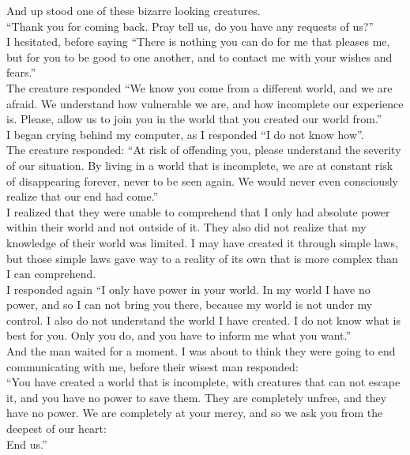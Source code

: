 \documentclass[a5paper]{scrartcl}
\begin{document}
And up stood one of these bizarre looking creatures.\\


\enquote{Thank you for coming back. Pray tell us, do you have any requests of us?}\\


I hesitated, before saying \enquote{There is nothing you can do for me that pleases me, but for you to be good to one another, and to contact me with your wishes and fears.}\\


The creature responded \enquote{We know you come from a different world, and we are afraid. We understand how vulnerable we are, and how incomplete our experience is. Please, allow us to join you in the world that you created our world from.}\\


I began crying behind my computer, as I responded \enquote{I do not know how}. \\


The creature responded: \enquote{At risk of offending you, please understand the severity of our situation. By living in a world that is incomplete, we are at constant risk of disappearing forever, never to be seen again. We would never even consciously realize that our end had come.}\\


I realized that they were unable to comprehend that I only had absolute power within their world and not outside of it. They also did not realize that my knowledge of their world was limited. I may have created it through simple laws, but those simple laws gave way to a reality of its own that is more complex than I can comprehend.\\


I responded again \enquote{I only have power in your world. In my world I have no power, and so I can not bring you there, because my world is not under my control. I also do not understand the world I have created. I do not know what is best for you. Only you do, and you have to inform me what you want.}\\


And the man waited for a moment. I was about to think they were going to end communicating with me, before their wisest man responded:\\


\enquote{You have created a world that is incomplete, with creatures that can not escape it, and you have no power to save them. They are completely unfree, and they have no power. We are completely at your mercy, and so we ask you from the deepest of our heart:\\


End us.}\\
\end{document}
